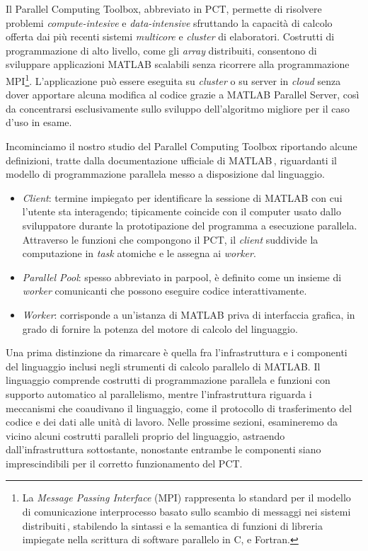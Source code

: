\nocite{MathWorksParallelComputing}
Il Parallel Computing Toolbox, abbreviato in PCT, permette di risolvere problemi \textit{compute-intesive} e  \textit{data-intensive} sfruttando 
la capacit\`a di calcolo offerta dai pi\`u recenti sistemi \textit{multicore} e \textit{cluster} di elaboratori. \newline
Costrutti di programmazione di alto livello, come gli \textit{array} distribuiti, consentono di sviluppare applicazioni MATLAB scalabili senza ricorrere alla programmazione 
MPI\footnote{La \textit{Message Passing Interface} (MPI) rappresenta lo standard per il modello di comunicazione interprocesso basato sullo scambio 
di messaggi nei sistemi distribuiti\,\cite{NMSUMPIIntro}, stabilendo la sintassi e la semantica di funzioni di libreria impiegate nella scrittura di software parallelo in C, \CC e Fortran.}.\newline
L'applicazione pu\`o essere eseguita su \textit{cluster} o su server in \textit{cloud} senza dover apportare alcuna modifica al codice grazie a MATLAB 
Parallel Server, cos\`i da concentrarsi esclusivamente sullo sviluppo dell'algoritmo migliore per il caso d'uso in esame.

Incominciamo il nostro studio del Parallel Computing Toolbox riportando alcune definizioni, tratte dalla documentazione ufficiale di MATLAB\,\cite{MathWorksWhatIsParallel}, riguardanti il modello di programmazione parallela messo a disposizione dal linguaggio.
\begin{itemize}
\item \textit{Client}: termine impiegato per identificare la sessione di MATLAB con cui l'utente sta interagendo; tipicamente coincide con il 
computer usato dallo sviluppatore durante la prototipazione del programma a esecuzione parallela.\newline
Attraverso le funzioni che compongono il PCT, il \textit{client} suddivide la computazione in \textit{task} atomiche e le assegna ai \textit{worker}.
\item \textit{Parallel Pool}: spesso abbreviato in parpool, \`e definito come un insieme di \textit{worker} comunicanti che possono eseguire codice interattivamente.
\item \textit{Worker}: corrisponde a un'istanza di MATLAB priva di interfaccia grafica, in grado di fornire la potenza del 
motore di calcolo del linguaggio.
\end{itemize}

Una prima distinzione da rimarcare \`e quella fra l'infrastruttura e i componenti del linguaggio inclusi negli strumenti di calcolo parallelo di MATLAB.\newline 
Il linguaggio comprende costrutti di programmazione parallela e funzioni con supporto automatico al parallelismo, mentre l'infrastruttura riguarda i meccanismi che coaudivano il linguaggio, come il protocollo di trasferimento del codice e dei dati alle unit\`a di lavoro. \newline
Nelle prossime sezioni, esamineremo da vicino alcuni costrutti paralleli proprio del linguaggio, astraendo dall'infrastruttura sottostante, nonostante entrambe le componenti 
siano imprescindibili per il corretto funzionamento del PCT.

